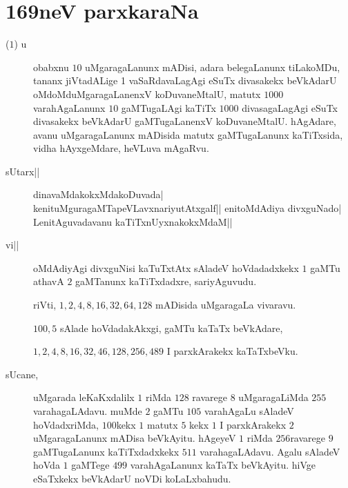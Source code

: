 \chapter{169neV parxkaraNa}


\begin{description}
\item[($1$) u] obabxnu $10$ uMgaragaLanunx mADisi, adara belegaLanunx
  tiLakoMDu, tananx jiVtadALige 1 vaSaRdavaLagAgi eSuTx divasakekx
  beVkAdarU oMdoMduMgaragaLanenxV koDuvaneMtalU, matutx $1000$
  varahAgaLanunx $10$ gaMTugaLAgi kaTiTx $1000$ divasagaLagAgi eSuTx
  divasakekx beVkAdarU gaMTugaLanenxV koDuvaneMtalU. hAgAdare, avanu
  uMgaragaLanunx mADisida matutx gaMTugaLanunx kaTiTxsida, vidha
  hAyxgeMdare, heVLuva mAgaRvu.

\item[sUtarx||] dinavaMdakokxMdakoDuvada|
  kenituMguragaMTapeVLavxnariyutAtxgalf|| enitoMdAdiya divxguNado|
  LenitAguvadavanu kaTiTxnUyxnakokxMdaM||

\item[vi||] oMdAdiyAgi divxguNisi kaTuTxtAtx sAladeV hoVdadadxkekx $1$
  gaMTu athavA $2$ gaMTanunx kaTiTxdadxre, sariyAguvudu.

    riVti, $1, 2, 4, 8, 16, 32, 64, 128$  mADisida uMgaragaLa vivaravu.
 
    $100, 5$ sAlade hoVdadakAkxgi, gaMTu kaTaTx beVkAdare,

    $1, 2, 4, 8, 16, 32, 46, 128, 256, 489$ I parxkArakekx kaTaTxbeVku.

\item[sUcane,] uMgarada leKaKxdalilx $1$ riMda $128$ ravarege $8$
  uMgaragaLiMda $255$ varahagaLAdavu. muMde $2$ gaMTu $105$ varahAgaLu
  sAladeV hoVdadxriMda, $100$kekx $1$ matutx $5$ kekx $1$ I parxkArakekx $2$
  uMgaragaLanunx mADisa beVkAyitu. hAgeyeV $1$ riMda $256$ravarege $9$
  gaMTugaLanunx kaTiTxdadxkekx $511$ varahagaLAdavu. Agalu sAladeV hoVda
  $1$ gaMTege $499$ varahAgaLanunx kaTaTx beVkAyitu. hiVge eSaTxkekx
  beVkAdarU noVDi koLaLxbahudu.
\end{description}
